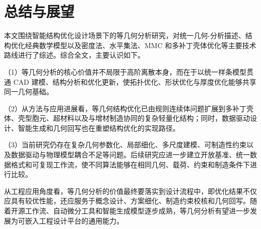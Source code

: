 \section{总结与展望}

本文围绕智能结构优化设计场景下的等几何分析研究，对统一几何-分析描述、结构优化经典数学模型以及密度法、水平集法、MMC 和多补丁壳体优化等主要技术路线进行了综述。综合全文，主要认识如下。

（1）等几何分析的核心价值并不局限于高阶离散本身，而在于以统一样条模型贯通 CAD 建模、结构分析和优化更新，使拓扑优化、形状优化与厚度优化能够共享同一几何基础。

（2）从方法与应用进展看，等几何结构优化已由规则连续体问题扩展到多补丁壳体、壳型胞元、超材料以及与增材制造协同的复杂轻量化结构；同时，数据驱动设计、智能生成和几何回写也在重塑结构优化的实现路径。

（3）当前研究仍存在复杂几何参数化、局部细化、多尺度建模、可制造性约束以及数据驱动与物理模型耦合不足等问题。后续研究应进一步建立开放基准、统一数据格式和可复现工作流，使不同算法能够在相同几何、载荷、约束和制造条件下进行比较。

从工程应用角度看，等几何分析的价值最终要落实到设计流程中，即优化结果不仅应具有较优性能，还应服务于概念设计、方案细化、制造约束校核和几何回写。随着开源工作流、自动微分工具和智能生成模型逐步成熟，等几何分析有望进一步发展为可嵌入工程设计平台的通用能力。
